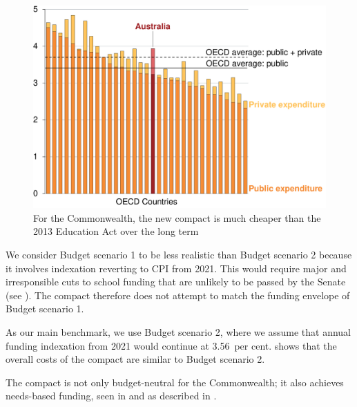 \documentclass{grattan}
\begin{document}
\begin{figure}
\caption{For the Commonwealth, the new compact is much cheaper than the 2013 Education Act over the long term}\label{fig:For-Cth-compact-is-cheaper}


\includegraphics[page=18]{atlas/Charts.pdf}

\end{figure}

We consider Budget scenario 1 to be less realistic than Budget scenario 2 because it involves indexation reverting to CPI from 2021.
This would require major and irresponsible cuts to school funding that are unlikely to be passed by the Senate (see ).
The compact therefore does not attempt to match the funding envelope of Budget scenario 1.

As our main benchmark, we use Budget scenario 2, where we assume that annual funding indexation from 2021 would continue at 3.56~per cent.
 shows that the overall costs of the compact are similar to Budget scenario 2.

The compact is not only budget-neutral for the Commonwealth; it also achieves needs-based funding, seen in  and as described in .
\end{document}
